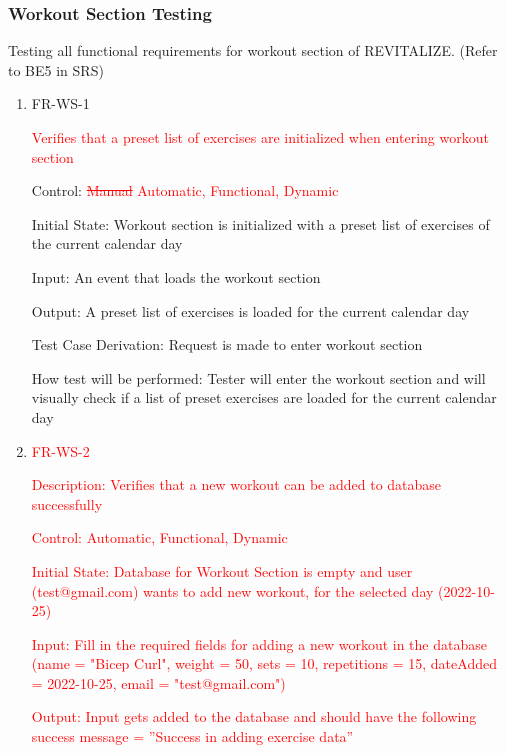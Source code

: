 \documentclass[12pt, titlepage]{article}
\begin{document}
\subsubsection{Workout Section Testing}

Testing all functional requirements for workout section of REVITALIZE. (Refer to BE5 in SRS)

\begin{enumerate}
	
	\item{FR-WS-1\\}

         \textcolor{red}{Verifies that a preset list of exercises are initialized when entering workout section}
	
	Control: \textcolor{red}{\sout{Manual}} \textcolor{red}{Automatic, Functional,           Dynamic}
	
	Initial State: Workout section is initialized with a preset list of exercises of the current calendar day
	
	Input: An event that loads the workout section
	
	Output: A preset list of exercises is loaded for the current calendar day
	
	Test Case Derivation: Request is made to enter workout section
	
	How test will be performed: Tester will enter the workout section and will visually check if a list of preset exercises are loaded for the current calendar day

  \item{\textcolor{red}{FR-WS-2\\}}

 \textcolor{red}{Description: Verifies that a new workout can be added to database successfully}
	
	\textcolor{red}{Control: Automatic, Functional, Dynamic}
	
	\textcolor{red}{Initial State: Database for Workout Section
    is empty and user (test@gmail.com) wants to add new workout, for the selected day (2022-10-25)}
	
	\textcolor{red}{Input: Fill in the required fields for adding a new workout in the
        database (name = "Bicep Curl", weight = 50, sets =
        10, repetitions = 15, dateAdded = 2022-10-25, email = "test@gmail.com")}
	
	\textcolor{red}{Output: Input gets added to the database and should have the
        following success message = ”Success in adding exercise data”}
	

\end{enumerate}
\end{document}
